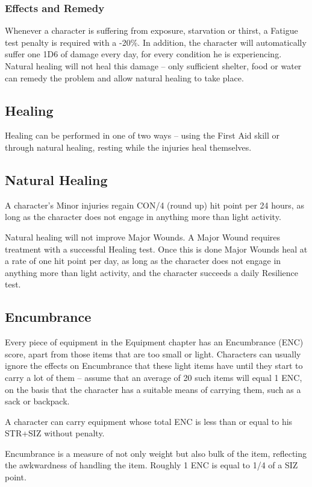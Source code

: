 \subsubsection{Effects and Remedy}
Whenever a character is suffering from exposure, starvation or thirst, a Fatigue test penalty is required with a -20\%. In addition, the character will automatically suffer one 1D6 of damage every day, for every condition he is experiencing. Natural healing will not heal this damage – only sufficient shelter, food or water can remedy the problem and allow natural healing to take place. 


\subsection{Healing}
Healing can be performed in one of two ways – using the First Aid skill or through natural healing, resting while the injuries heal themselves. 

\subsection{Natural Healing}
A character’s Minor injuries regain CON/4 (round up) hit point per 24 hours, as long as the character does not engage in anything more than light activity. 

Natural healing will not improve Major Wounds. A Major Wound requires treatment with a successful Healing test. Once this is done Major Wounds heal at a rate of one hit point per day, as long as the character does not engage in anything more than light activity, and the character succeeds a daily Resilience test. 


\subsection{Encumbrance}
\label{ssec:encumbrance}
Every piece of equipment in the Equipment chapter has an Encumbrance (ENC) score, apart from those items that are too small or light. Characters can usually ignore the effects on Encumbrance that these light items have until they start to carry a lot of them – assume that an average of 20 such items will equal 1 ENC, on the basis that the character has a suitable means of carrying them, such as a sack or backpack. 

A character can carry equipment whose total ENC is less than or equal to his STR+SIZ without penalty. 

Encumbrance is a measure of not only weight but also bulk of the item, reflecting the awkwardness of handling the item. Roughly 1 ENC is equal to 1/4 of a SIZ point.

